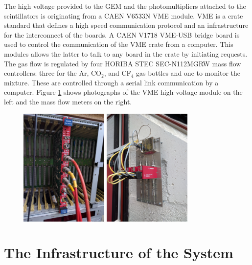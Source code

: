     The high voltage provided to the GEM and the photomultipliers attached to the scintillators is originating from a CAEN V6533N VME module. VME is a crate standard that defines a high speed communication protocol and an infrastructure for the interconnect of the boards. A CAEN V1718 VME-USB bridge board is used to control the communication of the VME crate from a computer. This modules allows the latter to talk to any board in the crate by initiating requests. The gas flow is regulated by four HORIBA STEC SEC-N112MGRW mass flow controllers: three for the Ar, CO$_2$, and CF$_4$ gas bottles and one to monitor the mixture. These are controlled through a serial link communication by a computer. Figure \ref{fig:III-1-gas-hv} shows photographs of the VME high-voltage module on the left and the mass flow meters on the right.

    \begin{figure}[h!]
      \centering
      \includegraphics[width=0.39\textwidth]{img/III-1-arch/hv.jpg}
      \includegraphics[width=0.39\textwidth]{img/III-1-arch/gas.jpg}
      \caption{}
      \label{fig:III-1-gas-hv}
    \end{figure}

  \section{The Infrastructure of the System}

